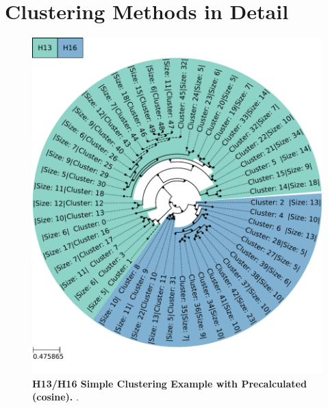 \section{Clustering Methods in Detail} \label{sec:Comparison_Clustering}

\begin{figure}[hbt]
    \centering
    \includegraphics[width=\textwidth]{PCA/Clustertree_Segment_4_H_Cosine.pdf}
    \caption[H13/H16 Simple Clustering Example with Precalculated (cosine)]{\textbf{H13/H16 Simple Clustering Example with Precalculated (cosine).} .}
    \label{fig:Simple_Clustertree_Cosine}
\end{figure}

